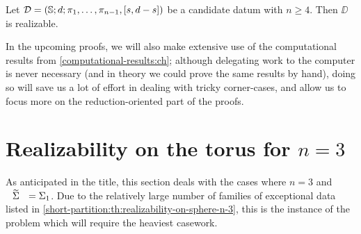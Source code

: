 \begin{theorem}\label{short-partition:th:realizability-on-sphere-n-ge-4}
Let $\mathcal{D}=(\mathbb{S}{};d;\pi_1,\ldots,\pi_{n-1},[s,d-s])$ be a candidate datum with $n\ge 4$. Then $\DD$ is realizable.
\end{theorem}

In the upcoming proofs, we will also make extensive use of the computational results from \cref{computational-results:ch}; although delegating work to the computer is never necessary (and in theory we could prove the same results by hand), doing so will save us a lot of effort in dealing with tricky corner-cases, and allow us to focus more on the reduction-oriented part of the proofs.

\section{Realizability on the torus for \texorpdfstring{$n=3$}{n=3}}

As anticipated in the title, this section deals with the cases where $n=3$ and $\tSigma=\surf{1}$. Due to the relatively large number of families of exceptional data listed in \cref{short-partition:th:realizability-on-sphere-n-3}, this is the instance of the problem which will require the heaviest casework.

